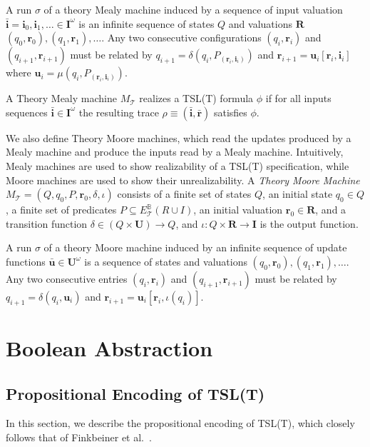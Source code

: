 \documentclass[runningheads]{llncs}
\newcommand{\theory}{\mathcal{T}}
\newcommand{\updf}{\mathbf{u}}
\newcommand{\updfs}{\mathbf{U}}
\newcommand{\rvar}{\mathbf{r}}
\newcommand{\rvars}{\mathbf{R}}
\newcommand{\ivar}{\mathbf{i}}
\newcommand{\ivars}{\mathbf{I}}
\newcommand{\bexpr}{E_\theory^\mathbb{B}(R \cup I)}
\begin{document}
A run $\sigma$ of a theory Mealy machine induced by a sequence of input valuation $\bar{\ivar} = \ivar_0, \ivar_1,\dots \in \ivars^\omega$ is an infinite sequence of states $Q$ and valuations $\rvars$ $(q_0,\rvar_0), (q_1,\rvar_1), \ldots$. Any two consecutive configurations $(q_i,\rvar_i)$ and $(q_{i+1}, \rvar_{i+1})$ must be related by $q_{i+1} = \delta(q_i, P_{(\rvar_i,\ivar_i)})$ and $\rvar_{i+1} = \updf_i[\rvar_i, \ivar_i]$ where $\updf_i = \mu(q_i, P_{(\rvar_i, \ivar_i)})$.

A Theory Mealy machine $M_\theory$ realizes a TSL(T) formula $\phi$ if for all inputs sequences $\bar{\ivar} \in \ivars^\omega$ the resulting trace $\rho \equiv (\bar{\ivar}, \bar{\rvar})$ satisfies $\phi$.


We also define Theory Moore machines, which read the updates produced by a Mealy machine and produce the inputs read by a Mealy machine. Intuitively, Mealy machines are used to show realizability of a TSL(T) specification, while Moore machines are used to show their unrealizability.
A \emph{Theory Moore Machine} $M_{\theory} = (Q, q_0, P, \rvar_0, \delta, \iota)$ consists of a finite set of states $Q$, an initial state $q_0 \in Q$, a finite set of predicates $P \subseteq \bexpr$, an initial valuation $\rvar_0 \in \rvars$, and a transition function $\delta \in (Q \times \updfs) \to Q$, and $\iota: Q \times \rvars \rightarrow \ivars$ is the output function.  %

A run $\sigma$ of a theory Moore machine induced by an infinite sequence of update functions $\bar{\updf} \in \updfs^\omega$ is a sequence of states and valuations $(q_0,\rvar_0), (q_1,\rvar_1), \ldots$. Any two consecutive entries $(q_i,\rvar_i)$ and $(q_{i+1}, \rvar_{i+1})$ must be related by $q_{i+1} = \delta(q_i, \updf_i)$ and $\rvar_{i+1} = \updf_i[\rvar_i, \iota(q_i)]$.

\section{Boolean Abstraction}
\label{sec:abstr}

\subsection{Propositional Encoding of TSL(T)}
In this section, we describe the propositional encoding of TSL(T), which closely follows that of Finkbeiner et al.\ \cite{finkbeiner2019a}.
\end{document}
